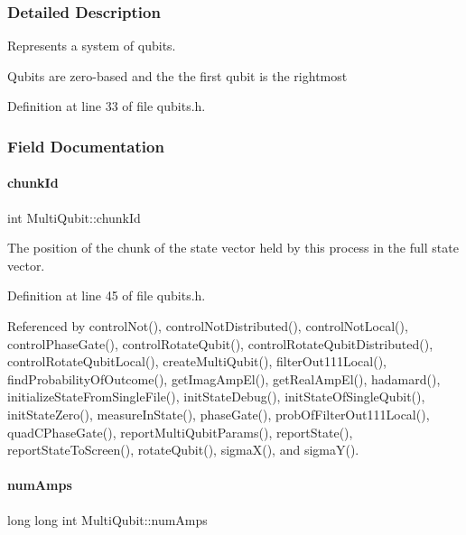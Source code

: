 \subsubsection{Detailed Description}
Represents a system of qubits. 

Qubits are zero-\/based and the the first qubit is the rightmost 

Definition at line 33 of file qubits.\+h.



\subsubsection{Field Documentation}
\mbox{\label{structMultiQubit_ab10c88249fa3825d6227ceec01d37e37}} 
\paragraph{\texorpdfstring{chunk\+Id}{chunkId}}
{\footnotesize\ttfamily int Multi\+Qubit\+::chunk\+Id}



The position of the chunk of the state vector held by this process in the full state vector. 



Definition at line 45 of file qubits.\+h.



Referenced by control\+Not(), control\+Not\+Distributed(), control\+Not\+Local(), control\+Phase\+Gate(), control\+Rotate\+Qubit(), control\+Rotate\+Qubit\+Distributed(), control\+Rotate\+Qubit\+Local(), create\+Multi\+Qubit(), filter\+Out111\+Local(), find\+Probability\+Of\+Outcome(), get\+Imag\+Amp\+El(), get\+Real\+Amp\+El(), hadamard(), initialize\+State\+From\+Single\+File(), init\+State\+Debug(), init\+State\+Of\+Single\+Qubit(), init\+State\+Zero(), measure\+In\+State(), phase\+Gate(), prob\+Of\+Filter\+Out111\+Local(), quad\+C\+Phase\+Gate(), report\+Multi\+Qubit\+Params(), report\+State(), report\+State\+To\+Screen(), rotate\+Qubit(), sigma\+X(), and sigma\+Y().

\mbox{\label{structMultiQubit_ae16f47d8b725c914fb7f66b6498d79db}} 
\paragraph{\texorpdfstring{num\+Amps}{numAmps}}
{\footnotesize\ttfamily long long int Multi\+Qubit\+::num\+Amps}



